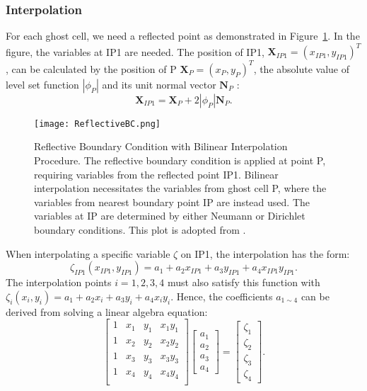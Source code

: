 \subsubsection{Interpolation} For each ghost cell, we need a reflected point as demonstrated in Figure~\ref{fig:Reflective Boundary Condition}. In the figure, the variables at IP1 are needed. The position of IP1, $\mathbf{X}_{IP1}=(x_{IP1},y_{IP1})^T$, can be calculated by the position of P $\mathbf{X}_P=(x_{P},y_{P})^T$, the absolute value of level set function $\left| {{\phi }_{P}} \right|$ and its unit normal vector $\mathbf{N}_P$ \cite{sambasivan2009ghost}:
$$\mathbf{X}_{IP1}=\mathbf{X}_P+2\left| {{\phi }_{P}} \right|\mathbf{N}_P.$$
\begin{figure}
    \centering
    \texttt{[image: ReflectiveBC.png]}
    \caption[Reflective Boundary Condition]{Reflective Boundary Condition with Bilinear Interpolation Procedure. The reflective boundary condition is applied at point P, requiring variables from the reflected point IP1. Bilinear interpolation necessitates the variables from ghost cell P, where the variables from nearest boundary point IP are instead used. The variables at IP are determined by either Neumann or Dirichlet boundary conditions. This plot is adopted from \cite{sambasivan2009ghost}.}
    \label{fig:Reflective Boundary Condition}
\end{figure}
When interpolating a specific variable $\zeta$ on IP1, the interpolation has the form:
$$\zeta_{IP1}(x_{IP1},y_{IP1})=a_1+a_2x_{IP1}+a_3y_{IP1}+a_4x_{IP1}y_{IP1}.$$
The interpolation points $i=1,2,3,4$ must also satisfy this function with $\zeta_{i}(x_{i},y_{i})=a_1+a_2x_{i}+a_3y_{i}+a_4x_{i}y_{i}.$ Hence, the coefficients $a_{1\sim4}$ can be derived from solving a linear algebra equation:
$$\begin{bmatrix}
    1&x_1&y_1&x_1y_1\\1&x_2&y_2&x_2y_2\\1&x_3&y_3&x_3y_3\\1&x_4&y_4&x_4y_4\\
\end{bmatrix}\begin{bmatrix}
    a_1\\a_2\\a_3\\a_4
\end{bmatrix}=\begin{bmatrix}
    \zeta_{1}\\\zeta_{2}\\\zeta_{3}\\\zeta_{4}
\end{bmatrix}.$$ 
